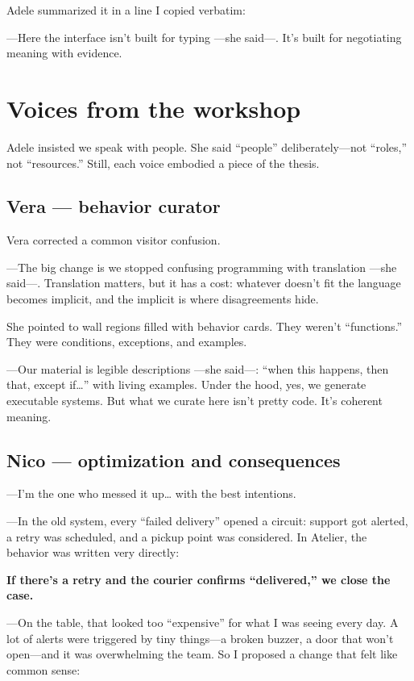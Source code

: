 \documentclass[11pt,a4paper]{article}
\begin{document}
Adele summarized it in a line I copied verbatim:

---Here the interface isn't built for typing ---she said---. It's built for
negotiating meaning with evidence.

\section{Voices from the workshop}

Adele insisted we speak with people. She said ``people''
deliberately---not ``roles,'' not ``resources.'' Still, each voice embodied a
piece of the thesis.

\subsection{Vera --- behavior curator}

Vera corrected a common visitor confusion.

---The big change is we stopped confusing programming with translation ---she
said---. Translation matters, but it has a cost: whatever doesn't fit the
language becomes implicit, and the implicit is where disagreements hide.

She pointed to wall regions filled with behavior cards. They weren't
``functions.'' They were conditions, exceptions, and examples.

---Our material is legible descriptions ---she said---: ``when this happens,
then that, except if\ldots'' with living examples. Under the hood, yes, we
generate executable systems. But what we curate here isn't pretty code. It's
coherent meaning.

\subsection{Nico --- optimization and consequences}

---I'm the one who messed it up\ldots{} with the best intentions.

---In the old system, every ``failed delivery'' opened a circuit: support got
alerted, a retry was scheduled, and a pickup point was considered. In
Atelier, the behavior was written very directly:

\begin{center}
\textbf{If there's a retry and the courier confirms ``delivered,'' we close
the case.}
\end{center}

---On the table, that looked too ``expensive'' for what I was seeing every
day. A lot of alerts were triggered by tiny things---a broken buzzer, a door
that won't open---and it was overwhelming the team. So I proposed a change
that felt like common sense:
\end{document}
